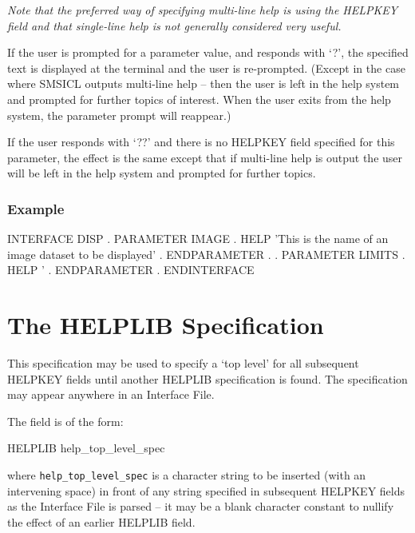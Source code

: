 \documentclass[twoside,11pt,nolof]{starlink}
\begin{document}
\emph{Note that the preferred way of specifying multi-line help
is using the HELPKEY field and that single-line help is not generally
considered very useful.}

If the user is prompted for a parameter value, and responds with `?',
the specified text is displayed at the terminal and the user is re-prompted.
(Except in the case where SMSICL outputs multi-line help -- then the user
is left in the help system and prompted for further topics of interest.
When the user exits from the help system, the parameter prompt will
reappear.)

If the user responds with `??' and there is no HELPKEY
field specified for this parameter, the effect is the same except that
if multi-line help is output the user will
be left in the help system and prompted for further topics.

\subsubsection*{Example}
\begin{terminalv}
INTERFACE DISP
   .
   PARAMETER IMAGE
         .
      HELP 'This is the name of an image dataset to be displayed'
         .
   ENDPARAMETER
      .
      .
   PARAMETER LIMITS
         .
      HELP '%
         .
   ENDPARAMETER
      .
ENDINTERFACE
\end{terminalv}

\section{The HELPLIB Specification
\label{helplib}}

This specification may be used to specify a `top level' for all subsequent
HELPKEY fields until another HELPLIB specification is found. The specification
may appear anywhere in an Interface File.

The field is of the form:
\begin{terminalv}
HELPLIB help_top_level_spec
\end{terminalv}
where \texttt{help\_top\_level\_spec} is a character string to be inserted (with an
intervening space) in front of any string specified in subsequent HELPKEY
fields as the Interface File is parsed --
it may be a blank character constant to nullify the
effect of an earlier HELPLIB field.
\end{document}
